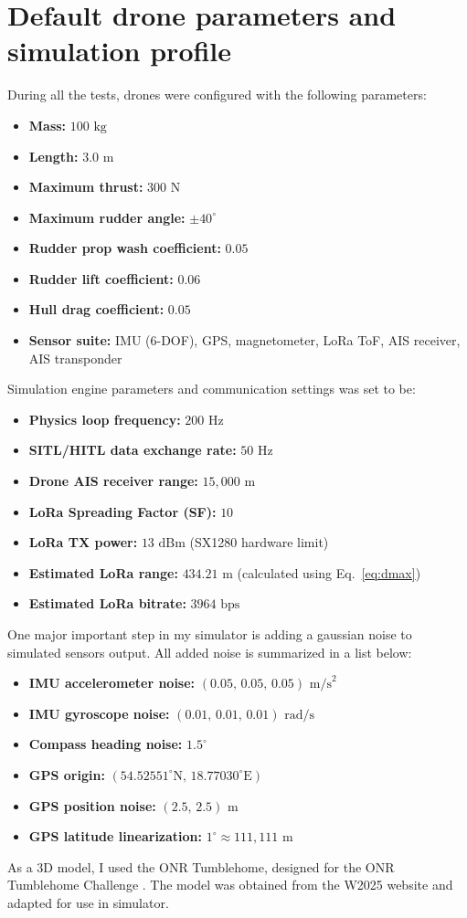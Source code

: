\section{Default drone parameters and simulation profile}

During all the tests, drones were configured with the following parameters:


\begin{itemize}
    \item \textbf{Mass:} $100 \text{ kg}$
    \item \textbf{Length:} $3.0 \text{ m}$
    \item \textbf{Maximum thrust:} $300 \text{ N}$
    \item \textbf{Maximum rudder angle:} $\pm 40^\circ$
    \item \textbf{Rudder prop wash coefficient:} $0.05$
    \item \textbf{Rudder lift coefficient:} $0.06$
    \item \textbf{Hull drag coefficient:} $0.05$
    \item \textbf{Sensor suite:} IMU (6-DOF), GPS, magnetometer, LoRa ToF, AIS receiver, AIS transponder
\end{itemize}


Simulation engine parameters and communication settings was set to be:

\begin{itemize}
    \item \textbf{Physics loop frequency:} $200 \text{ Hz}$
    \item \textbf{SITL/HITL data exchange rate:} $50 \text{ Hz}$
    \item \textbf{Drone AIS receiver range:} $15{,}000 \text{ m}$
    \item \textbf{LoRa Spreading Factor (SF):} $10$
    \item \textbf{LoRa TX power:} $13 \text{ dBm}$ (SX1280 hardware limit)
    \item \textbf{Estimated LoRa range:} $434.21 \text{ m}$ (calculated using Eq.~\ref{eq:dmax})
    \item \textbf{Estimated LoRa bitrate:} $3964 \text{ bps}$
\end{itemize}

One major important step in my simulator is adding a gaussian noise to simulated sensors output. All added noise is summarized in a list below:

\begin{itemize}
    \item \textbf{IMU accelerometer noise:} $(0.05, \, 0.05, \, 0.05) \text{ m/s}^2$
    \item \textbf{IMU gyroscope noise:} $(0.01, \, 0.01, \, 0.01) \text{ rad/s}$
    \item \textbf{Compass heading noise:} $1.5^\circ$
    \item \textbf{GPS origin:} $(54.52551^\circ\text{N}, \, 18.77030^\circ\text{E})$
    \item \textbf{GPS position noise:} $(2.5, \, 2.5) \text{ m}$
    \item \textbf{GPS latitude linearization:} $1^\circ \approx 111{,}111 \text{ m}$
\end{itemize}

As a 3D model, I used the ONR Tumblehome, designed for the ONR Tumblehome Challenge \cite{W2025_ONRT}. The model was obtained from the W2025 website and adapted for use in simulator. 